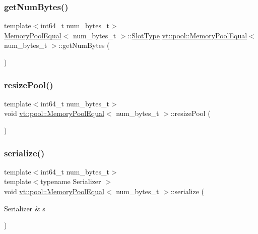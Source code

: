 \subsubsection{\texorpdfstring{get\+Num\+Bytes()}{getNumBytes()}}
{\footnotesize\ttfamily template$<$int64\+\_\+t num\+\_\+bytes\+\_\+t$>$ \\
\hyperlink{structvt_1_1pool_1_1_memory_pool_equal}{Memory\+Pool\+Equal}$<$ num\+\_\+bytes\+\_\+t $>$\+::\hyperlink{structvt_1_1pool_1_1_memory_pool_equal_a101fdcb943d0cb0863cf17655e0b4e1c}{Slot\+Type} \hyperlink{structvt_1_1pool_1_1_memory_pool_equal}{vt\+::pool\+::\+Memory\+Pool\+Equal}$<$ num\+\_\+bytes\+\_\+t $>$\+::get\+Num\+Bytes (\begin{DoxyParamCaption}{ }\end{DoxyParamCaption})}

\mbox{\label{structvt_1_1pool_1_1_memory_pool_equal_acb03d02014eaebd24522525b059d4fb4}} 
\subsubsection{\texorpdfstring{resize\+Pool()}{resizePool()}}
{\footnotesize\ttfamily template$<$int64\+\_\+t num\+\_\+bytes\+\_\+t$>$ \\
void \hyperlink{structvt_1_1pool_1_1_memory_pool_equal}{vt\+::pool\+::\+Memory\+Pool\+Equal}$<$ num\+\_\+bytes\+\_\+t $>$\+::resize\+Pool (\begin{DoxyParamCaption}{ }\end{DoxyParamCaption})}

\mbox{\label{structvt_1_1pool_1_1_memory_pool_equal_a3235659dbd03bf8c1df2f39d77f33b56}} 
\subsubsection{\texorpdfstring{serialize()}{serialize()}}
{\footnotesize\ttfamily template$<$int64\+\_\+t num\+\_\+bytes\+\_\+t$>$ \\
template$<$typename Serializer $>$ \\
void \hyperlink{structvt_1_1pool_1_1_memory_pool_equal}{vt\+::pool\+::\+Memory\+Pool\+Equal}$<$ num\+\_\+bytes\+\_\+t $>$\+::serialize (\begin{DoxyParamCaption}\item[{Serializer \&}]{s }\end{DoxyParamCaption})\hspace{0.3cm}{\ttfamily [inline]}}



